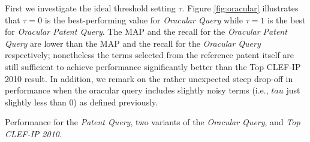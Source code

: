 First we investigate the ideal threshold setting $\tau$.
Figure \ref{fig:oracular} illustrates that $\tau=0$ is the
best-performing value for {\em Oracular Query} while $\tau=1$ is the
best for {\em Oracular Patent Query}.  The MAP and the recall for the {\em Oracular
Patent Query} are lower than the MAP and the recall for the {\em Oracular Query} respectively;
nonetheless the terms selected from the reference patent itself are
still sufficient to achieve performance significantly better than the
Top CLEF-IP 2010 result.  In addition, we remark on the rather
unexpected steep drop-off in performance when the oracular query
includes slightly noisy terms (i.e., $tau$ just slightly less than 0)
as defined previously.

%
%
%
%

\begin{table}[t!]
  \begin{center}
   \caption{Performance for the {\em Patent Query}, two variants of the {\em Oracular Query}, and {\em Top CLEF-IP 2010}.}
   \vspace*{1ex}
     
  \label{tab:optquery}
  \end{center}  
\end{table}

